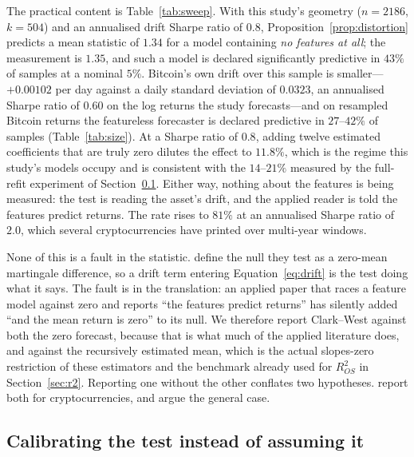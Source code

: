 \documentclass{article}
\theoremstyle{plain}
\theoremstyle{definition}
\newcommand{\rsq}{R^2_{OS}}
\begin{document}
The practical content is Table~\ref{tab:sweep}. With this study's geometry
($n=2186$, $k=504$) and an annualised drift Sharpe ratio of $0.8$,
Proposition~\ref{prop:distortion} predicts a mean statistic of $1.34$ for a model containing
\emph{no features at all}; the measurement is $1.35$, and such a model is declared
significantly predictive in $43\%$ of samples at a nominal $5\%$. Bitcoin's own drift over
this sample is smaller---$+0.00102$ per day against a daily standard deviation of $0.0323$,
an annualised Sharpe ratio of $0.60$ on the log returns the study forecasts---and on
resampled Bitcoin returns the featureless forecaster is declared predictive in $27$--$42\%$
of samples (Table~\ref{tab:size}). At a Sharpe ratio of $0.8$, adding twelve
estimated coefficients that are truly zero dilutes the effect to $11.8\%$, which is the
regime this study's models occupy and is consistent with the $14$--$21\%$ measured by the
full-refit experiment of Section~\ref{sec:calibration}. Either way, nothing about the
features is being measured: the test is reading the asset's drift, and the applied reader is
told the features predict returns. The rate rises to $81\%$ at an annualised Sharpe ratio of
$2.0$, which several cryptocurrencies have printed over multi-year windows.

None of this is a fault in the statistic. \citet{clark2006} define the null they
test as a zero-mean martingale difference, so a drift term entering
Equation~\eqref{eq:drift} is the test doing what it says. The fault is in the
translation: an applied paper that races a feature model against zero and reports
``the features predict returns'' has silently added ``and the mean return is
zero'' to its null. We therefore report Clark--West against both the zero forecast,
because that is what much of the applied literature does, and against the
recursively estimated mean, which is the actual slopes-zero restriction of these
estimators and the benchmark already used for $\rsq$ in Section~\ref{sec:r2}.
Reporting one without the other conflates two hypotheses. \citet{magner2022} report
both for cryptocurrencies, and \citet{moosa2016} argue the general case.

\subsection{Calibrating the test instead of assuming it}
\label{sec:calibration}
\end{document}
